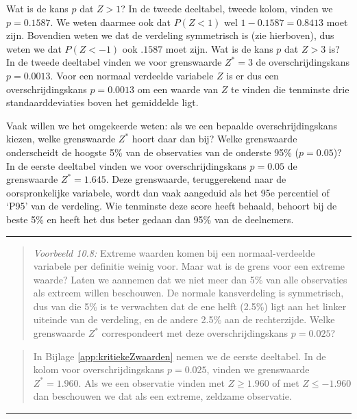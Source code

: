 \documentclass[
]{book}
\begin{document}
Wat is de kans \(p\) dat \(Z>1\)? In de tweede deeltabel, tweede kolom,
vinden we \(p=0.1587\). We weten daarmee ook dat \(P(Z<1)\) wel
\(1-0.1587=0.8413\) moet zijn. Bovendien weten we dat de verdeling
symmetrisch is (zie hierboven), dus weten we dat \(P(Z< -1)\) ook \(.1587\)
moet zijn. Wat is de kans \(p\) dat \(Z>3\) is? In de tweede deeltabel
vinden we voor grenswaarde \(Z^*=3\) de overschrijdingskans
\(p=0.0013\). Voor een normaal verdeelde variabele \(Z\) is er dus een
overschrijdingskans \(p=0.0013\) om een waarde van \(Z\) te vinden die
tenminste drie standaarddeviaties boven het gemiddelde ligt.

Vaak willen we het omgekeerde weten: als we een bepaalde
overschrijdingskans kiezen, welke grenswaarde \(Z^*\) hoort daar dan bij?
Welke grenswaarde onderscheidt de hoogste 5\% van de observaties van de
onderste 95\% (\(p=0.05\))? In de eerste deeltabel vinden we
voor overschrijdingskans \(p=0.05\) de grenswaarde \(Z^*=1.645\). Deze
grenswaarde, teruggerekend naar de oorspronkelijke variabele, wordt dan
vaak aangeduid als het 95e percentiel of `P95' van de verdeling. Wie
tenminste deze score heeft behaald, behoort bij de beste 5\% en heeft het dus
beter gedaan dan 95\% van de deelnemers.

\begin{center}\rule{0.5\linewidth}{0.5pt}\end{center}

\begin{quote}
\emph{Voorbeeld 10.8:}
Extreme waarden komen bij een normaal-verdeelde variabele per definitie
weinig voor. Maar wat is de grens voor een extreme waarde? Laten we
aannemen dat we niet meer dan 5\% van alle observaties als extreem willen
beschouwen. De normale kansverdeling is symmetrisch, dus van die 5\% is
te verwachten dat de ene helft (2.5\%) ligt aan het linker uiteinde van
de verdeling, en de andere 2.5\% aan de rechterzijde. Welke grenswaarde
\(Z^*\) correspondeert met deze overschrijdingskans \(p=0.025\)?
\end{quote}

\begin{quote}
In
Bijlage \ref{app:kritiekeZwaarden} nemen we de eerste deeltabel. In de kolom
voor overschrijdingskans \(p=0.025\), vinden we grenswaarde
\(Z^*=1.960\). Als we een observatie vinden met \(Z \ge 1.960\) of met
\(Z \le -1.960\) dan beschouwen we dat als een extreme, zeldzame
observatie.
\end{quote}

\begin{center}\rule{0.5\linewidth}{0.5pt}\end{center}
\end{document}
